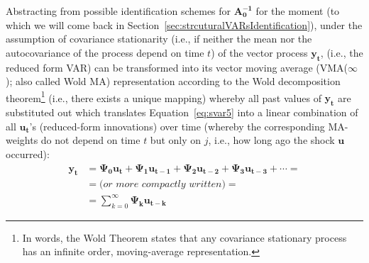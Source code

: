 \documentclass[a4paper,11pt,listof=nochaptergap,oneside,pointednumbers,bibtotoc,bigheadings,liststotoc]{scrbook}
\theoremstyle{mysatz}
\theoremstyle{mydefinition}
\theoremstyle{mytheorem}
\theoremstyle{mybemerkung}
\newcommand{\vect}[1]{\boldsymbol{\mathbf{#1}}}
\begin{document}
Abstracting from possible identification schemes for $\vect{A_0^{-1}}$ for the moment (to which we will come back in Section~\ref{sec:strcuturalVARsIdentification}), under the assumption of covariance stationarity (i.e., if neither the mean nor the autocovariance of the process depend on time $t$) of the vector process $\vect{y_t}$, \vect{y_t} (i.e., the reduced form VAR) can be transformed into its vector moving average (VMA($\infty$); also called Wold MA) representation according to the Wold decomposition theorem\footnote{In words, the Wold Theorem states that any covariance stationary process has an infinite order, moving-average representation.} (i.e., there exists a unique mapping) whereby all past values of $\vect{y_t}$ are substituted out which translates Equation~\ref{eq:svar5} into a linear combination of all $\vect{u_t}$'s (reduced-form innovations) over time (whereby the corresponding MA-weights do not depend on time $t$ but only on $j$, i.e., how long ago the shock $\vect{u}$ occurred):
\begin{equation} \label{eq:svar7}
\begin{split}
 			\vect{y_t} & = \vect{\Psi_0}\vect{u_t} + \vect{\Psi_1}\vect{u_{t-1}} + \vect{\Psi_{2}}\vect{u_{t-2}} + \vect{\Psi_{3}}\vect{u_{t-3}} + \cdots = \\
			& = \textit{(or more compactly written)} = \\
			& = \sum\limits_{k=0}^\infty \vect{\Psi_k}\vect{u_{t-k}}
\end{split}								
\end{equation}
\end{document}
